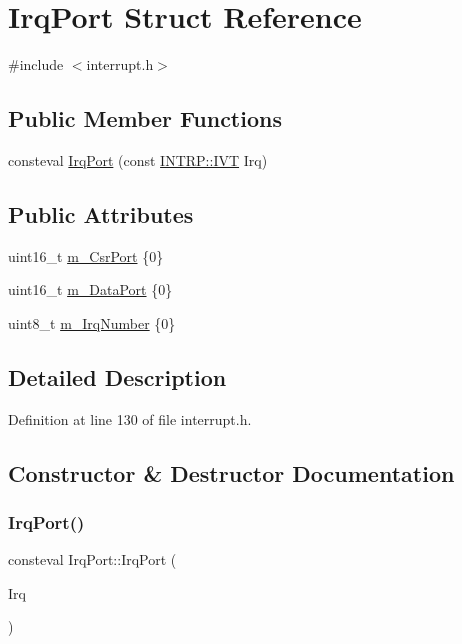 \hypertarget{struct_irq_port}{}\section{Irq\+Port Struct Reference}
\label{struct_irq_port}


{\ttfamily \#include $<$interrupt.\+h$>$}

\subsection*{Public Member Functions}
\begin{DoxyCompactItemize}
\item 
consteval \hyperlink{struct_irq_port_a6b8ecf986a659ab7169cc4e7bf5fdde2}{Irq\+Port} (const \hyperlink{namespace_i_n_t_r_p_a790699fb2953ef4ab70c7dc7148a1c94}{I\+N\+T\+R\+P\+::\+I\+VT} Irq)
\end{DoxyCompactItemize}
\subsection*{Public Attributes}
\begin{DoxyCompactItemize}
\item 
uint16\+\_\+t \hyperlink{struct_irq_port_a5ac1b74e9c140c3ea39a69cd7188b828}{m\+\_\+\+Csr\+Port} \{0\}
\item 
uint16\+\_\+t \hyperlink{struct_irq_port_ae3faad3d02d2b4e1d7955fc46d946470}{m\+\_\+\+Data\+Port} \{0\}
\item 
uint8\+\_\+t \hyperlink{struct_irq_port_a73a87471680527ab85f05b708c375fe7}{m\+\_\+\+Irq\+Number} \{0\}
\end{DoxyCompactItemize}


\subsection{Detailed Description}


Definition at line 130 of file interrupt.\+h.



\subsection{Constructor \& Destructor Documentation}
\mbox{\label{struct_irq_port_a6b8ecf986a659ab7169cc4e7bf5fdde2}} 
\subsubsection{\texorpdfstring{Irq\+Port()}{IrqPort()}}
{\footnotesize\ttfamily consteval Irq\+Port\+::\+Irq\+Port (\begin{DoxyParamCaption}\item[{const \hyperlink{namespace_i_n_t_r_p_a790699fb2953ef4ab70c7dc7148a1c94}{I\+N\+T\+R\+P\+::\+I\+VT}}]{Irq }\end{DoxyParamCaption})\hspace{0.3cm}{\ttfamily [inline]}}



